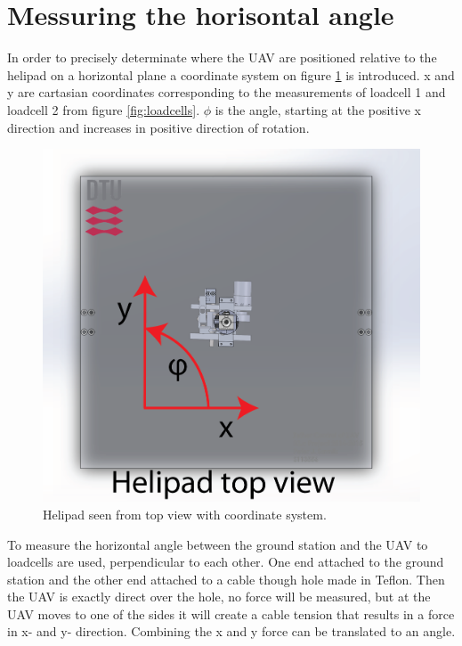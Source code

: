\section{Messuring the horisontal angle}
In order to precisely determinate where the UAV are positioned relative to the helipad on a horizontal plane a coordinate system on figure \ref{fig:top-coordinates} is introduced. x and y are cartasian coordinates corresponding to the measurements of loadcell 1 and loadcell 2 from figure \ref{fig:loadcells}. $\phi$ is the angle, starting at the positive x direction and increases in positive direction of rotation.

\begin{figure}[H]
\centering
\includegraphics[scale=0.75]{graphics/cad/top-coordinates.png}
\caption{Helipad seen from top view with coordinate system.}
\label{fig:top-coordinates}
\end{figure}

\noindent
To measure the horizontal angle between the ground station and the UAV to loadcells are used, perpendicular to each other. One end attached to the ground station and the other end attached to a cable though hole made in Teflon. Then the UAV is exactly direct over the hole, no force will be measured, but at the UAV moves to one of the sides it will create a cable tension that results in a force in x- and y- direction. Combining the x and y force can be translated to an angle. 


